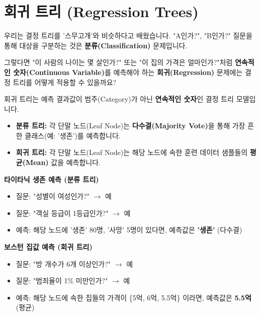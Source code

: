 \documentclass[11pt,a4paper]{book}
\theoremstyle{definition}
\begin{document}
\section{회귀 트리 (Regression Trees)}

우리는 결정 트리를 '스무고개'와 비슷하다고 배웠습니다. "A인가?", "B인가?" 질문을 통해 대상을 구분하는 것은 \textbf{분류(Classification)} 문제입니다.

그렇다면 "이 사람의 나이는 몇 살인가?" 또는 "이 집의 가격은 얼마인가?"처럼 \textbf{연속적인 숫자(Continuous Variable)}를 예측해야 하는 \textbf{회귀(Regression)} 문제에는 결정 트리를 어떻게 적용할 수 있을까요?

\begin{boxDefinition}[title={회귀 트리 (Regression Tree)란?}]
    회귀 트리는 예측 결과값이 범주(Category)가 아닌 \textbf{연속적인 숫자}인 결정 트리 모델입니다.

    \begin{itemize}
        \item \textbf{분류 트리:} 각 단말 노드(Leaf Node)는 \textbf{다수결(Majority Vote)}을 통해 가장 흔한 클래스(예: '생존')를 예측합니다.
        \item \textbf{회귀 트리:} 각 단말 노드(Leaf Node)는 해당 노드에 속한 훈련 데이터 샘플들의 \textbf{평균(Mean)} 값을 예측합니다.
    \end{itemize}
\end{boxDefinition}

\begin{boxExample}
    \textbf{타이타닉 생존 예측 (분류 트리)}
    \begin{itemize}
        \item 질문: "성별이 여성인가?" $\rightarrow$ 예
        \item 질문: "객실 등급이 1등급인가?" $\rightarrow$ 예
        \item 예측: 해당 노드에 '생존' 80명, '사망' 5명이 있다면, 예측값은 \textbf{'생존'} (다수결)
    \end{itemize}

    \textbf{보스턴 집값 예측 (회귀 트리)}
    \begin{itemize}
        \item 질문: "방 개수가 6개 이상인가?" $\rightarrow$ 예
        \item 질문: "범죄율이 1\% 미만인가?" $\rightarrow$ 예
        \item 예측: 해당 노드에 속한 집들의 가격이 \{5억, 6억, 5.5억\} 이라면, 예측값은 \textbf{5.5억} (평균)
    \end{itemize}
\end{boxExample}
\end{document}
